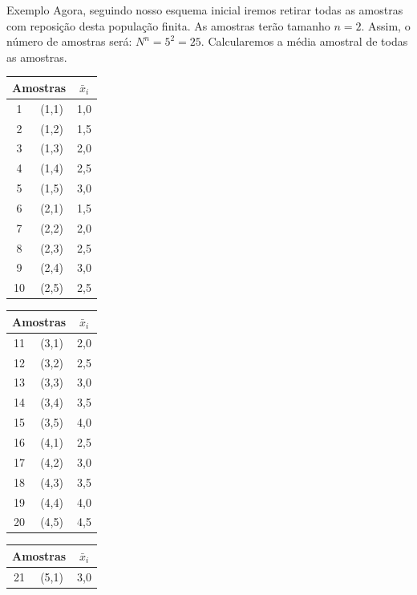 \documentclass[hyperref={pdfpagelabels=false}]{beamer}
\begin{document}
\begin{frame}{Exemplo}
	Agora, seguindo nosso esquema inicial iremos retirar todas as amostras com reposição desta população finita. As amostras terão tamanho $n=2$. Assim, o número de amostras será: $N^n = 5^2 = 25$. Calcularemos a média amostral de todas as amostras.
	
	\pause
	\begin{center}
		
	\begin{tabular}{|c|c|c|}
		\hline 
		\multicolumn{2}{|c|}{Amostras} & $\bar{x}_i$ \\ 
		\hline 
		1 & (1,1) & 1,0 \\ 
		\hline 
		2 & (1,2) & 1,5 \\ 
		\hline 
		3 & (1,3) & 2,0 \\ 
		\hline 
		4 & (1,4) & 2,5 \\ 
		\hline 
		5 & (1,5) & 3,0 \\ 
		\hline 
		6 & (2,1) & 1,5 \\ 
		\hline 
		7 & (2,2) & 2,0 \\ 
		\hline 
		8 & (2,3) & 2,5 \\ 
		\hline 
		9 & (2,4) & 3,0 \\ 
		\hline 
		10 & (2,5) & 2,5 \\ 
		\hline 
	\end{tabular} 
\pause
\begin{tabular}{|c|c|c|}
	\hline 
	\multicolumn{2}{|c|}{Amostras} & $\bar{x}_i$ \\ 
	\hline 
	11 & (3,1) & 2,0 \\ 
	\hline 
	12 & (3,2) & 2,5 \\ 
	\hline 
	13 & (3,3) & 3,0 \\ 
	\hline 
	14 & (3,4) & 3,5 \\ 
	\hline 
	15 & (3,5) & 4,0 \\ 
	\hline 
	16 & (4,1) & 2,5 \\ 
	\hline 
	17 & (4,2) & 3,0 \\ 
	\hline 
	18 & (4,3) & 3,5 \\ 
	\hline 
	19 & (4,4) & 4,0 \\ 
	\hline 
	20 & (4,5) & 4,5 \\ 
	\hline 
\end{tabular} 
\pause
	\begin{tabular}{|c|c|c|}
		\hline 
		\multicolumn{2}{|c|}{Amostras} & $\bar{x}_i$ \\ 
		\hline 
		21 & (5,1) & 3,0 \\ 

\end{tabular}
\end{center}
\end{frame}
\end{document}
